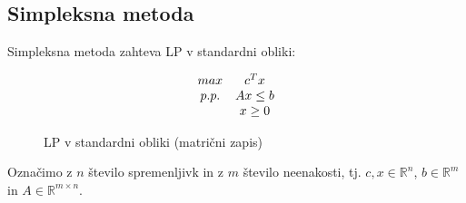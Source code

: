 \documentclass[11pt, a4paper]{article}
\begin{document}
    \subsection{Simpleksna metoda}

    Simpleksna metoda zahteva LP v standardni obliki:
    \begin{figure}[h!]
        \[
            \begin{array}{ c c }
                max & c^Tx \\
                p.p. & Ax \le b \\
                & x \ge 0 \\
            \end{array}
        \]
        \caption{LP v standardni obliki (matrični zapis)}
    \end{figure}

    Označimo z \(n\) število spremenljivk in z \(m\) število neenakosti, tj. \(c,x \in \mathbb{R}^n \), \(b \in \mathbb{R}^m\) in \(A \in \mathbb{R}^{m \times n}\).
\end{document}
